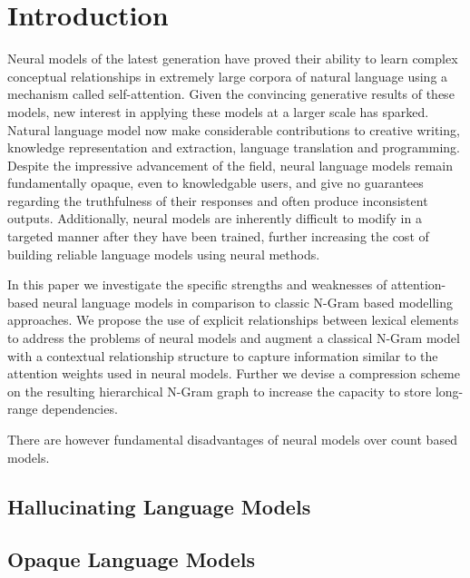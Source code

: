 
\chapter{Introduction}

Neural models of the latest generation have proved their ability to learn complex conceptual relationships in extremely large corpora of natural language using a mechanism called self-attention. Given the convincing generative results of these models, new interest in applying these models at a larger scale has sparked. Natural language model now make considerable contributions to creative writing, knowledge representation and extraction, language translation and programming. Despite the impressive advancement of the field, neural language models remain fundamentally opaque, even to knowledgable users, and give no guarantees regarding the truthfulness of their responses and often produce inconsistent outputs. Additionally, neural models are inherently difficult to modify in a targeted manner after they have been trained, further increasing the cost of building reliable language models using neural methods.

In this paper we investigate the specific strengths and weaknesses of attention-based neural language models in comparison to classic N-Gram based modelling approaches. We propose the use of explicit relationships between lexical elements to address the problems of neural models and augment a classical N-Gram model with a contextual relationship structure to capture information similar to the attention weights used in neural models. Further we devise a compression scheme on the resulting hierarchical N-Gram graph to increase the capacity to store long-range dependencies.


There are however fundamental disadvantages of neural models over count based models.

\section{Hallucinating Language Models}

\section{Opaque Language Models}


